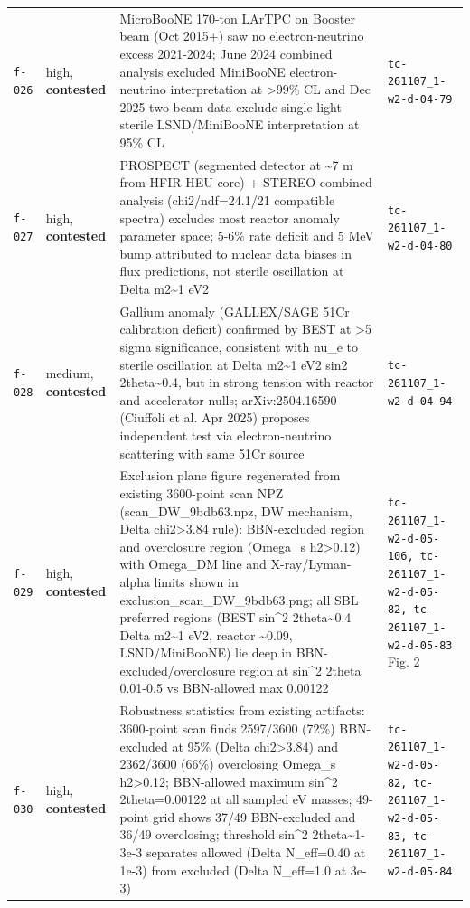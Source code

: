 \documentclass[11pt,a4paper]{article}
\begin{document}
\begin{longtable}{@{}p{}p{}p{}p{}@{}}
\texttt{f-026} & high, \textbf{contested} & MicroBooNE 170-ton LArTPC on Booster beam (Oct 2015+) saw no electron-neutrino excess 2021-2024; June 2024 combined analysis excluded MiniBooNE electron-neutrino interpretation at \textgreater{}99\% CL and Dec 2025 two-beam data exclude single light sterile LSND/MiniBooNE interpretation at 95\% CL & \texttt{tc-261107\_\allowbreak{}1-w2-d-04-79} \\
\texttt{f-027} & high, \textbf{contested} & PROSPECT (segmented detector at \textasciitilde{}7 m from HFIR HEU core) + STEREO combined analysis (chi2/ndf=24.1/21 compatible spectra) excludes most reactor anomaly parameter space; 5-6\% rate deficit and 5 MeV bump attributed to nuclear data biases in flux predictions, not sterile oscillation at Delta m2\textasciitilde{}1 eV2 & \texttt{tc-261107\_\allowbreak{}1-w2-d-04-80} \\
\texttt{f-028} & medium, \textbf{contested} & Gallium anomaly (GALLEX/SAGE 51Cr calibration deficit) confirmed by BEST at \textgreater{}5 sigma significance, consistent with nu\_e to sterile oscillation at Delta m2\textasciitilde{}1 eV2 sin2 2theta\textasciitilde{}0.4, but in strong tension with reactor and accelerator nulls; arXiv:2504.16590 (Ciuffoli et al. Apr 2025) proposes independent test via electron-neutrino scattering with same 51Cr source & \texttt{tc-261107\_\allowbreak{}1-w2-d-04-94} \\
\texttt{f-029} & high, \textbf{contested} & Exclusion plane figure regenerated from existing 3600-point scan NPZ (scan\_DW\_9bdb63.npz, DW mechanism, Delta chi2\textgreater{}3.84 rule): BBN-excluded region and overclosure region (Omega\_s h2\textgreater{}0.12) with Omega\_DM line and X-ray/Lyman-alpha limits shown in exclusion\_scan\_DW\_9bdb63.png; all SBL preferred regions (BEST sin\textasciicircum{}2 2theta\textasciitilde{}0.4 Delta m2\textasciitilde{}1 eV2, reactor \textasciitilde{}0.09, LSND/MiniBooNE) lie deep in BBN-excluded/overclosure region at sin\textasciicircum{}2 2theta 0.01-0.5 vs BBN-allowed max 0.00122 & \texttt{tc-261107\_\allowbreak{}1-w2-d-05-106,\allowbreak{} tc-261107\_\allowbreak{}1-w2-d-05-82,\allowbreak{} tc-261107\_\allowbreak{}1-w2-d-05-83} Fig. 2 \\
\texttt{f-030} & high, \textbf{contested} & Robustness statistics from existing artifacts: 3600-point scan finds 2597/3600 (72\%) BBN-excluded at 95\% (Delta chi2\textgreater{}3.84) and 2362/3600 (66\%) overclosing Omega\_s h2\textgreater{}0.12; BBN-allowed maximum sin\textasciicircum{}2 2theta=0.00122 at all sampled eV masses; 49-point grid shows 37/49 BBN-excluded and 36/49 overclosing; threshold sin\textasciicircum{}2 2theta\textasciitilde{}1-3e-3 separates allowed (Delta N\_eff=0.40 at 1e-3) from excluded (Delta N\_eff=1.0 at 3e-3) & \texttt{tc-261107\_\allowbreak{}1-w2-d-05-82,\allowbreak{} tc-261107\_\allowbreak{}1-w2-d-05-83,\allowbreak{} tc-261107\_\allowbreak{}1-w2-d-05-84} \\

\end{longtable}
\end{document}
